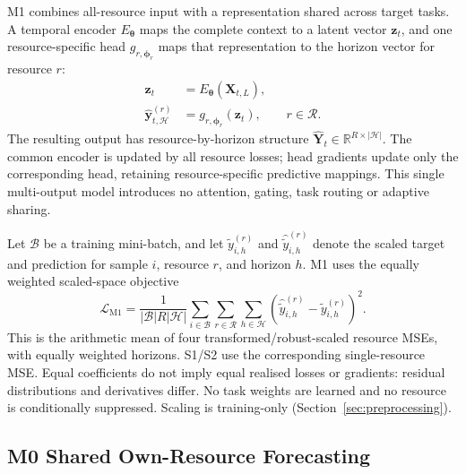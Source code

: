 \documentclass[a4paper,fleqn]{cas-dc}
\begin{document}
M1 combines all-resource input with a representation shared across target
tasks. A temporal encoder $E_{\boldsymbol{\theta}}$ maps the complete context
to a latent vector $\mathbf{z}_t$, and one resource-specific head
$g_{r,\boldsymbol{\phi}_r}$ maps that representation to the horizon vector for
resource $r$:
\begin{equation}
  \begin{aligned}
    \mathbf{z}_t
      &= E_{\boldsymbol{\theta}}(\mathbf{X}_{t,L}), \\
    \widehat{\mathbf{y}}_{t,\mathcal{H}}^{(r)}
      &= g_{r,\boldsymbol{\phi}_r}(\mathbf{z}_t),
      && r\in\mathcal{R}.
  \end{aligned}
  \label{eq:m1-forecast}
\end{equation}
The resulting output has resource-by-horizon structure
$\widehat{\mathbf{Y}}_{t}\in\mathbb{R}^{R\times|\mathcal{H}|}$.
The common encoder is updated by all resource losses; head gradients update
only the corresponding head, retaining resource-specific predictive mappings.
This single multi-output model introduces no attention, gating, task routing
or adaptive sharing.

Let $\mathcal{B}$ be a training mini-batch, and let
$\widetilde{y}_{i,h}^{(r)}$ and
$\widehat{\widetilde{y}}_{i,h}^{(r)}$ denote the scaled target and prediction
for sample $i$, resource $r$, and horizon $h$. M1 uses the equally weighted
scaled-space objective
\begin{equation}
  \mathcal{L}_{\mathrm{M1}}
  = \frac{1}{|\mathcal{B}|R|\mathcal{H}|}
    \sum_{i\in\mathcal{B}}
    \sum_{r\in\mathcal{R}}
    \sum_{h\in\mathcal{H}}
    \left(
      \widehat{\widetilde{y}}_{i,h}^{(r)}
      - \widetilde{y}_{i,h}^{(r)}
    \right)^2.
  \label{eq:m1-loss}
\end{equation}
This is the arithmetic mean of four transformed/robust-scaled resource MSEs,
with equally weighted horizons. S1/S2 use the corresponding single-resource
MSE. Equal coefficients do not imply equal realised losses or gradients:
residual distributions and derivatives differ. No task weights are learned
and no resource is conditionally suppressed. Scaling is training-only
(Section~\ref{sec:preprocessing}).

\subsection{M0 Shared Own-Resource Forecasting}
\label{sec:m0}
\end{document}
